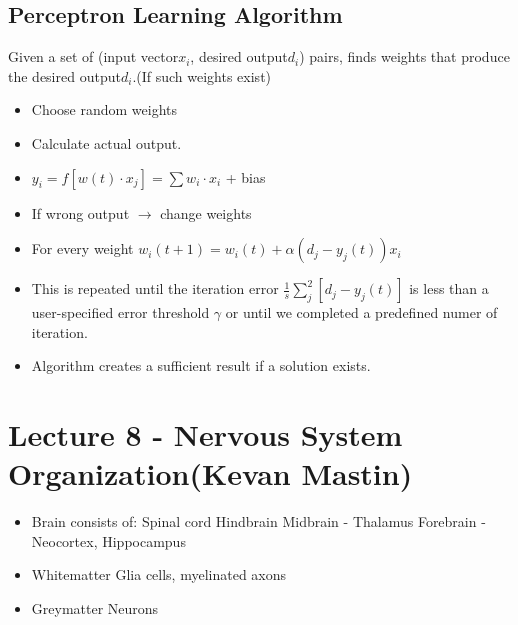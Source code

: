 \documentclass[english,11pt]{article}
\begin{document}
\subsection{Perceptron Learning Algorithm}
Given a set of (input vector$x_i$, desired output$d_i$) pairs, finds weights that produce the desired output$d_i$.(If such weights exist)\\
\begin{itemize}
\item Choose random weights
\item Calculate actual output.
\item $y_i = f[w(t)\cdot x_j] = \sum w_i \cdot x_i$ + bias
\item If wrong output $\rightarrow$ change weights
\item For every weight $w_i(t+1) = w_i(t) + \alpha(d_j-y_j(t))x_i$
\item This is repeated until the iteration error $\frac{1}{s}\sum_j^2[d_j-y_j(t)]$ is less than a user-specified error threshold $\gamma$ or until we completed a predefined numer of iteration.
\item Algorithm creates a sufficient result if a solution exists.
\end{itemize}

\section{Lecture 8 - Nervous System Organization(Kevan Mastin)}
\begin{itemize}
\item Brain consists of:
\subitem Spinal cord
\subitem Hindbrain
\subitem Midbrain - Thalamus
\subitem Forebrain - Neocortex, Hippocampus
\item Whitematter
\subitem Glia cells, myelinated axons
\item Greymatter
\subitem Neurons 
\end{itemize}
\end{document}
